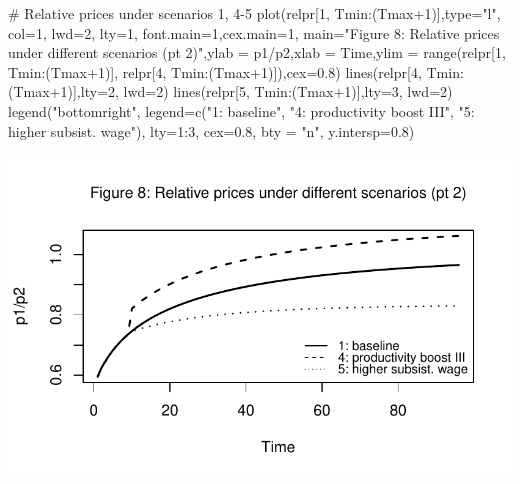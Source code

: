\documentclass[
  letterpaper,
  DIV=11,
  numbers=noendperiod]{scrreprt}
\newenvironment{Shaded}{\begin{snugshade}}{\end{snugshade}}
\newcommand{\AttributeTok}[1]{\textcolor[rgb]{0.40,0.45,0.13}{#1}}
\newcommand{\CommentTok}[1]{\textcolor[rgb]{0.37,0.37,0.37}{#1}}
\newcommand{\DecValTok}[1]{\textcolor[rgb]{0.68,0.00,0.00}{#1}}
\newcommand{\FloatTok}[1]{\textcolor[rgb]{0.68,0.00,0.00}{#1}}
\newcommand{\FunctionTok}[1]{\textcolor[rgb]{0.28,0.35,0.67}{#1}}
\newcommand{\NormalTok}[1]{\textcolor[rgb]{0.00,0.23,0.31}{#1}}
\newcommand{\SpecialCharTok}[1]{\textcolor[rgb]{0.37,0.37,0.37}{#1}}
\newcommand{\StringTok}[1]{\textcolor[rgb]{0.13,0.47,0.30}{#1}}
\begin{document}
\begin{Shaded}
\begin{Highlighting}[]
\CommentTok{\# Relative prices under scenarios 1, 4{-}5}
\FunctionTok{plot}\NormalTok{(relpr[}\DecValTok{1}\NormalTok{, Tmin}\SpecialCharTok{:}\NormalTok{(Tmax}\SpecialCharTok{+}\DecValTok{1}\NormalTok{)],}\AttributeTok{type=}\StringTok{"l"}\NormalTok{, }\AttributeTok{col=}\DecValTok{1}\NormalTok{, }\AttributeTok{lwd=}\DecValTok{2}\NormalTok{, }\AttributeTok{lty=}\DecValTok{1}\NormalTok{, }\AttributeTok{font.main=}\DecValTok{1}\NormalTok{,}\AttributeTok{cex.main=}\DecValTok{1}\NormalTok{, }
     \AttributeTok{main=}\StringTok{"Figure 8: Relative prices under different scenarios (pt 2)"}\NormalTok{,}\AttributeTok{ylab =} \StringTok{\textquotesingle{}p1/p2\textquotesingle{}}\NormalTok{,}\AttributeTok{xlab =} \StringTok{\textquotesingle{}Time\textquotesingle{}}\NormalTok{,}\AttributeTok{ylim =} \FunctionTok{range}\NormalTok{(relpr[}\DecValTok{1}\NormalTok{, Tmin}\SpecialCharTok{:}\NormalTok{(Tmax}\SpecialCharTok{+}\DecValTok{1}\NormalTok{)], relpr[}\DecValTok{4}\NormalTok{, Tmin}\SpecialCharTok{:}\NormalTok{(Tmax}\SpecialCharTok{+}\DecValTok{1}\NormalTok{)]),}\AttributeTok{cex=}\FloatTok{0.8}\NormalTok{)}
\FunctionTok{lines}\NormalTok{(relpr[}\DecValTok{4}\NormalTok{, Tmin}\SpecialCharTok{:}\NormalTok{(Tmax}\SpecialCharTok{+}\DecValTok{1}\NormalTok{)],}\AttributeTok{lty=}\DecValTok{2}\NormalTok{, }\AttributeTok{lwd=}\DecValTok{2}\NormalTok{)}
\FunctionTok{lines}\NormalTok{(relpr[}\DecValTok{5}\NormalTok{, Tmin}\SpecialCharTok{:}\NormalTok{(Tmax}\SpecialCharTok{+}\DecValTok{1}\NormalTok{)],}\AttributeTok{lty=}\DecValTok{3}\NormalTok{, }\AttributeTok{lwd=}\DecValTok{2}\NormalTok{)}
\FunctionTok{legend}\NormalTok{(}\StringTok{"bottomright"}\NormalTok{, }\AttributeTok{legend=}\FunctionTok{c}\NormalTok{(}\StringTok{"1: baseline"}\NormalTok{, }\StringTok{"4: productivity boost III"}\NormalTok{, }\StringTok{"5: higher subsist. wage"}\NormalTok{), }\AttributeTok{lty=}\DecValTok{1}\SpecialCharTok{:}\DecValTok{3}\NormalTok{, }\AttributeTok{cex=}\FloatTok{0.8}\NormalTok{, }\AttributeTok{bty =} \StringTok{"n"}\NormalTok{, }\AttributeTok{y.intersp=}\FloatTok{0.8}\NormalTok{)}
\end{Highlighting}
\end{Shaded}

\includegraphics{a_ricardian_two_sector_model_files/figure-pdf/ricardo2_4-2.pdf}
\end{document}
